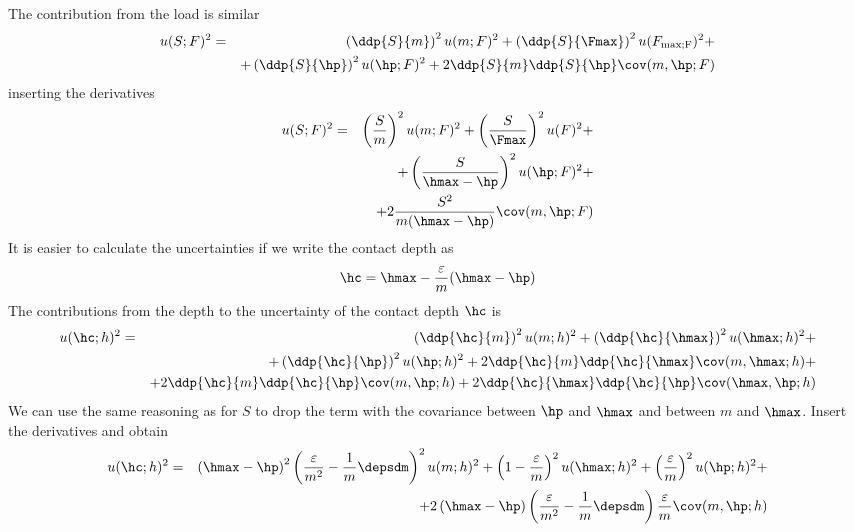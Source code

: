The contribution from the load is similar
\begin{eqnarray*}
 u(S;F)^2 &=& 
 \left( \ddp{ S}{ m}\right)^2 u(m;F)^2 + 
 \left( \ddp{ S}{ \Fmax}\right)^2 u(F_\mathrm{max;F})^2 + \\
&&   + \left( \ddp{ S}{ \hp}\right)^2 u(\hp;F)^2 +
   2  \ddp{ S}{ m}\ddp{ S}{ \hp} \cov(m,\hp;F)   
  \end{eqnarray*}
inserting the derivatives
\begin{eqnarray*}
 u(S;F)^2 &=& 
 \left( \frac{S}{m}\right)^2 u(m;F)^2 + 
 \left( \frac{S}{\Fmax} \right)^2 u(F)^2 + \\ 
  &&  + \left( \frac{S}{\hmax- \hp}\right)^2 u(\hp;F)^2 + \\
  &&
   + 2  \frac{S^2}{m(\hmax - \hp)} \cov(m,\hp;F)  
  \end{eqnarray*}
%  
  It is easier to calculate the uncertainties if we write the contact depth as 
  $$
  \hc = \hmax - \frac{\varepsilon}{m} (\hmax - \hp) 
  $$
  The contributions from the depth to the uncertainty of the contact depth $\hc$ is 
  \begin{eqnarray*}
 u(\hc;h)^2 &=& 
 \left( \ddp{ \hc}{ m }\right)^2 u(m;h)^2 + 
 \left( \ddp{ \hc}{ \hmax} \right)^2 u(\hmax;h)^2 + \\ 
  &&  + 
  \left( \ddp{ \hc}{ \hp}\right)^2 u(\hp;h)^2 +
   2  \ddp{ \hc}{ m}\ddp{ \hc}{ \hmax} \cov(m,\hmax;h)  
  +  \\
   && + 2  \ddp{ \hc}{ m}\ddp{ \hc}{ \hp} \cov(m,\hp;h)  
  +  2  \ddp{ \hc}{ \hmax}\ddp{ \hc}{ \hp} \cov(\hmax,\hp;h) 
  \end{eqnarray*}
We can use the same reasoning as for $S$ to drop the term with the covariance between $\hp$ and $\hmax$ and between $m$ and $\hmax$.
Insert the derivatives and obtain
  \begin{eqnarray*}
 u(\hc;h)^2 &=& 
   \left( \hmax - \hp \right)^2 \left( \frac{\varepsilon}{m^2} - \frac1m \depsdm \right)^2 u(m;h)^2 + 
 \left( 1- \frac{\varepsilon}{m}\right)^2 u(\hmax;h)^2 + \left(\frac{\varepsilon }{m} \right)^2 u(\hp;h)^2 +
    \\  && + 2 \left( \hmax - \hp \right) \left( \frac{\varepsilon}{m^2} - \frac1m \depsdm \right) \frac{\varepsilon }{m}  \cov(m,\hp;h)   
  \end{eqnarray*}
